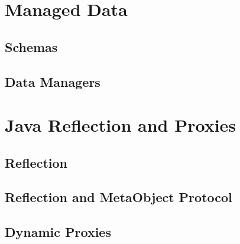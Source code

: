 \section{Managed Data}\label{Managed Data}

\subsection{Schemas}\label{Schemas}

\subsection{Data Managers}\label{Data Managers}

\section{Java Reflection and Proxies}\label{Java Reflection and Proxies}

\subsection{Reflection}\label{Reflection}

\subsection{Reflection and Meta­Object Protocol}\label{Reflection and Meta­Object Protocol}

\subsection{Dynamic Proxies}\label{Dynamic Proxies}

